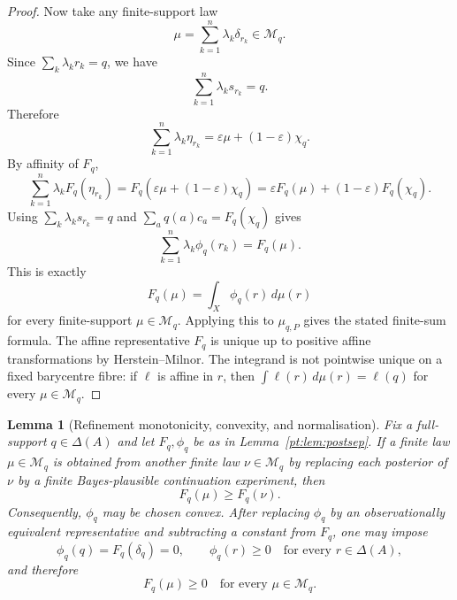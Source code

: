 \documentclass[11pt,a4paper]{article}
\newtheorem{lemma}[theorem]{Lemma}
\theoremstyle{definition}
\newcommand{\1}{\mathbf 1}
\begin{document}
\begin{proof}
Now take any finite-support law
\[
\mu=\sum_{k=1}^n\lambda_k\delta_{r_k}\in\mathcal M_q.
\]
Since $\sum_k\lambda_k r_k=q$, we have
\[
\sum_{k=1}^n\lambda_k s_{r_k}=q.
\]
Therefore
\[
\sum_{k=1}^n\lambda_k\eta_{r_k}
=
\varepsilon\mu+(1-\varepsilon)\chi_q.
\]
By affinity of $F_q$,
\[
\sum_{k=1}^n\lambda_k F_q(\eta_{r_k})
=
F_q\!\left(\varepsilon\mu+(1-\varepsilon)\chi_q\right)
=
\varepsilon F_q(\mu)+(1-\varepsilon)F_q(\chi_q).
\]
Using $\sum_k\lambda_k s_{r_k}=q$ and $\sum_a q(a)c_a=F_q(\chi_q)$ gives
\[
\sum_{k=1}^n\lambda_k\phi_q(r_k)=F_q(\mu).
\]
This is exactly
\[
F_q(\mu)=\int_X\phi_q(r)\,d\mu(r)
\]
for every finite-support $\mu\in\mathcal M_q$.  Applying this to $\mu_{q,P}$ gives the stated finite-sum formula.  The
affine representative $F_q$ is unique up to positive affine transformations by Herstein--Milnor.  The integrand is not
pointwise unique on a fixed barycentre fibre: if $\ell$ is affine in $r$, then $\int\ell(r)\,d\mu(r)=\ell(q)$ for every
$\mu\in\mathcal M_q$.
\end{proof}

\begin{lemma}[Refinement monotonicity, convexity, and normalisation]\label{pt:lem:convnorm}
Fix a full-support $q\in\Delta(A)$ and let $F_q,\phi_q$ be as in Lemma~\ref{pt:lem:postsep}.  If a finite law
$\mu\in\mathcal M_q$ is obtained from another finite law $\nu\in\mathcal M_q$ by replacing each posterior of $\nu$ by a
finite Bayes-plausible continuation experiment, then
\[
F_q(\mu)\ge F_q(\nu).
\]
Consequently, $\phi_q$ may be chosen convex.  After replacing $\phi_q$ by an observationally equivalent representative
and subtracting a constant from $F_q$, one may impose
\[
\phi_q(q)=F_q(\delta_q)=0,
\qquad
\phi_q(r)\ge 0\quad\text{for every }r\in\Delta(A),
\]
and therefore
\[
F_q(\mu)\ge 0\quad\text{for every }\mu\in\mathcal M_q.
\]
\end{lemma}
\end{document}

